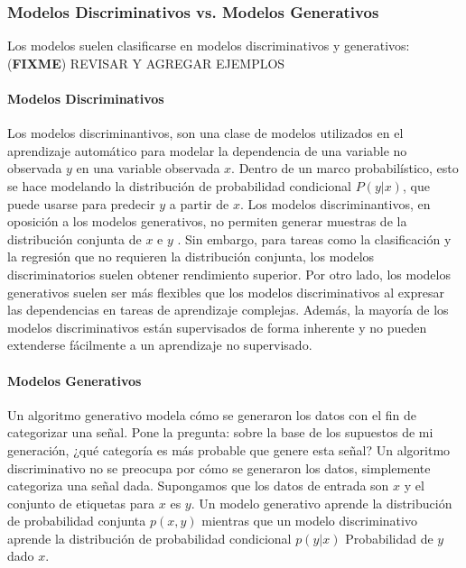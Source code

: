 \documentclass[a4paper,11pt,spanish]{book}
\newcommand*{\FIXME}[1]{{(\textbf{FIXME}) {#1}}}
\begin{document}
      \subsubsection{Modelos Discriminativos vs. Modelos Generativos}
	Los modelos suelen clasificarse en modelos discriminativos y generativos:
	\FIXME{REVISAR Y AGREGAR EJEMPLOS}
	\paragraph{Modelos Discriminativos}
	  Los modelos discriminantivos, son una clase de modelos utilizados en el aprendizaje automático para modelar la dependencia de una variable no observada $y$  en una variable observada $x$. 
	  Dentro de un marco probabilístico, esto se hace modelando la distribución de probabilidad condicional $P (y | x)$, que puede usarse para predecir $y$ a partir de  $x$.
	  Los modelos discriminantivos, en oposición a los modelos generativos, no permiten generar muestras de la distribución conjunta de $x$ e $y$ . 
	  Sin embargo, para tareas como la clasificación y la regresión que no requieren la distribución conjunta, los modelos discriminatorios suelen obtener rendimiento superior.  
	  Por otro lado, los modelos generativos suelen ser más flexibles que los modelos discriminativos al expresar las dependencias en tareas de aprendizaje complejas. 
	  Además, la mayoría de los modelos discriminativos están supervisados ​​de forma inherente y no pueden extenderse fácilmente a un aprendizaje no supervisado.
	
	\paragraph{Modelos Generativos}
	  Un algoritmo generativo modela cómo se generaron los datos con el fin de categorizar una señal. Pone la pregunta: sobre la base de los supuestos de mi generación, 
	  ¿qué categoría es más probable que genere esta señal? Un algoritmo discriminativo no se preocupa por cómo se generaron los datos, simplemente categoriza una señal dada.
	  Supongamos que los datos de entrada son $x$ y el conjunto de etiquetas para $x$ es $y$. Un modelo generativo aprende la distribución de probabilidad conjunta 
	  $p (x, y)$  mientras que un modelo discriminativo aprende la distribución de probabilidad condicional  $p (y | x)$ Probabilidad de $y$ dado $x$.
	
\end{document}
